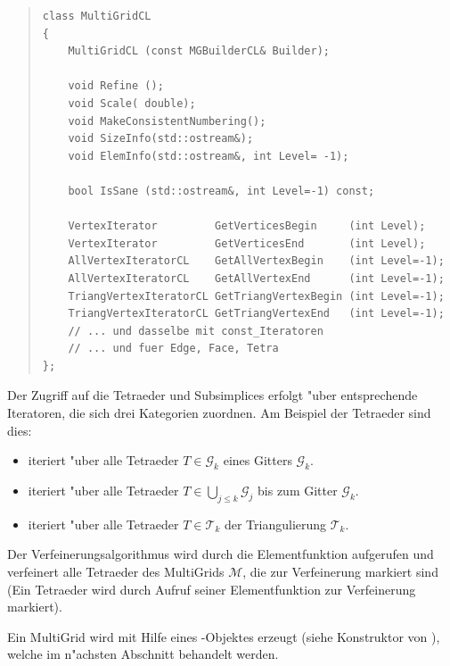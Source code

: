 \documentclass[11pt,a4paper]{article}
\newenvironment{Code}{\begin{quote}\scriptsize}{\end{quote}}
\begin{document}
\begin{Code}
\begin{verbatim}
class MultiGridCL
{
    MultiGridCL (const MGBuilderCL& Builder);

    void Refine ();
    void Scale( double);
    void MakeConsistentNumbering();
    void SizeInfo(std::ostream&);
    void ElemInfo(std::ostream&, int Level= -1);

    bool IsSane (std::ostream&, int Level=-1) const;

    VertexIterator         GetVerticesBegin     (int Level);
    VertexIterator         GetVerticesEnd       (int Level);
    AllVertexIteratorCL    GetAllVertexBegin    (int Level=-1);
    AllVertexIteratorCL    GetAllVertexEnd      (int Level=-1);
    TriangVertexIteratorCL GetTriangVertexBegin (int Level=-1);
    TriangVertexIteratorCL GetTriangVertexEnd   (int Level=-1);
    // ... und dasselbe mit const_Iteratoren
    // ... und fuer Edge, Face, Tetra
};
\end{verbatim}
\end{Code}

Der Zugriff auf die Tetraeder und Subsimplices erfolgt "uber entsprechende
Iteratoren, die sich drei Kategorien zuordnen. Am Beispiel der Tetraeder sind
dies:
\begin{itemize}
    \item {} iteriert "uber alle Tetraeder $T\in\mathcal G_k$
    eines Gitters $\mathcal G_k$.
    \item {} iteriert "uber alle Tetraeder
    $T\in\bigcup_{j\leq k}{\mathcal G_j}$ bis zum Gitter $\mathcal G_k$.
    \item {} iteriert "uber alle Tetraeder
    $T\in\mathcal T_k$ der Triangulierung $\mathcal T_k$.
\end{itemize}

Der Verfeinerungsalgorithmus wird durch die Elementfunktion 
aufgerufen und verfeinert alle Tetraeder des MultiGrids $\mathcal M$, die zur
Verfeinerung markiert sind (Ein Tetraeder wird durch Aufruf seiner
Elementfunktion  zur Verfeinerung markiert).

Ein MultiGrid wird mit Hilfe eines -Objektes erzeugt (siehe
Konstruktor von ), welche im n"achsten Abschnitt behandelt
werden.
\end{document}
